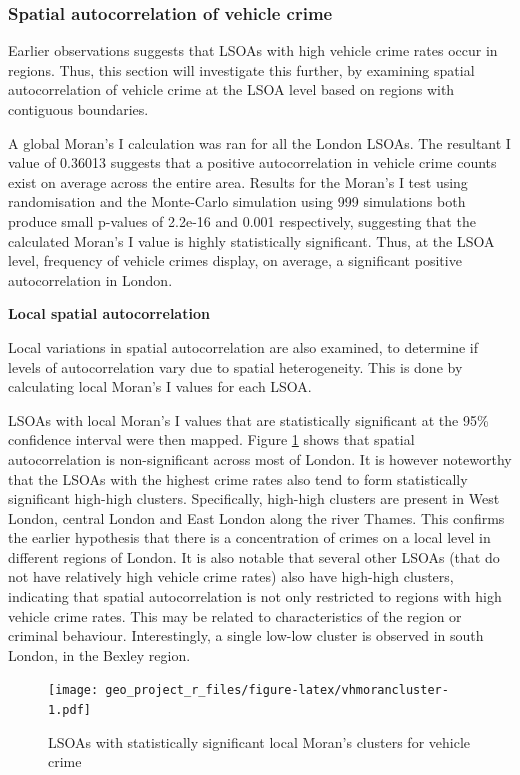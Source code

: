 \documentclass[]{article}
\theoremstyle{definition}
\theoremstyle{definition}
\theoremstyle{definition}
\theoremstyle{remark}
\begin{document}
\subsubsection{Spatial autocorrelation of vehicle
crime}\label{spatial-autocorrelation-of-vehicle-crime}

Earlier observations suggests that LSOAs with high vehicle crime rates
occur in regions. Thus, this section will investigate this further, by
examining spatial autocorrelation of vehicle crime at the LSOA level
based on regions with contiguous boundaries.

A global Moran's I calculation was ran for all the London LSOAs. The
resultant I value of 0.36013 suggests that a positive autocorrelation in
vehicle crime counts exist on average across the entire area. Results
for the Moran's I test using randomisation and the Monte-Carlo
simulation using 999 simulations both produce small p-values of 2.2e-16
and 0.001 respectively, suggesting that the calculated Moran's I value
is highly statistically significant. Thus, at the LSOA level, frequency
of vehicle crimes display, on average, a significant positive
autocorrelation in London.

\textbf{Local spatial autocorrelation}

Local variations in spatial autocorrelation are also examined, to
determine if levels of autocorrelation vary due to spatial
heterogeneity. This is done by calculating local Moran's I values for
each LSOA.

LSOAs with local Moran's I values that are statistically significant at
the 95\% confidence interval were then mapped. Figure
\ref{fig:vhmorancluster} shows that spatial autocorrelation is
non-significant across most of London. It is however noteworthy that the
LSOAs with the highest crime rates also tend to form statistically
significant high-high clusters. Specifically, high-high clusters are
present in West London, central London and East London along the river
Thames. This confirms the earlier hypothesis that there is a
concentration of crimes on a local level in different regions of London.
It is also notable that several other LSOAs (that do not have relatively
high vehicle crime rates) also have high-high clusters, indicating that
spatial autocorrelation is not only restricted to regions with high
vehicle crime rates. This may be related to characteristics of the
region or criminal behaviour. Interestingly, a single low-low cluster is
observed in south London, in the Bexley region.

\begin{figure}
\centering
\texttt{[image: geo\_project\_r\_files/figure-latex/vhmorancluster-1.pdf]}
\caption{\label{fig:vhmorancluster}LSOAs with statistically significant
local Moran's clusters for vehicle crime}
\end{figure}
\end{document}
